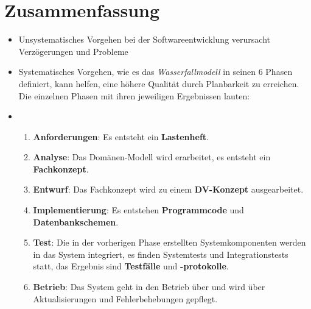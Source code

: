 \section{Zusammenfassung}

\begin{itemize}
    \item Unsystematisches Vorgehen bei der Softwareentwicklung verursacht Verzögerungen und Probleme
    \item Systematisches Vorgehen, wie es das \textit{Wasserfallmodell} in seinen 6 Phasen definiert, kann helfen, eine höhere Qualität
    durch Planbarkeit zu erreichen.\\
    Die einzelnen Phasen mit ihren jeweiligen Ergebnissen lauten:\\
    \item[]
    \begin{enumerate}
        \item \textbf{Anforderungen}: Es entsteht ein \textbf{Lastenheft}.
        \item \textbf{Analyse}: Das Domänen-Modell wird erarbeitet, es entsteht ein \textbf{Fachkonzept}.
        \item \textbf{Entwurf}: Das Fachkonzept wird zu einem \textbf{DV-Konzept} ausgearbeitet.
        \item \textbf{Implementierung}: Es entstehen \textbf{Programmcode} und \textbf{Datenbankschemen}.
        \item \textbf{Test}: Die in der vorherigen Phase erstellten Systemkomponenten werden in das System integriert, es finden Systemtests und Integrationstests statt, das Ergebnis sind \textbf{Testfälle} und \textbf{-protokolle}.
        \item \textbf{Betrieb}: Das System geht in den Betrieb über und wird über Aktualisierungen und Fehlerbehebungen gepflegt.

    \end{enumerate}

\end{itemize}